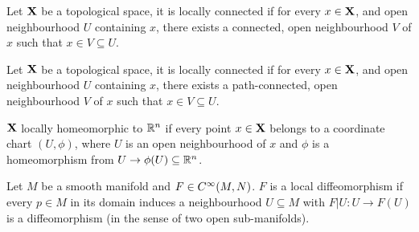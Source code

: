 \documentclass[../../main.tex]{subfiles}
\begin{document}
\begin{definition}\label{chp4:locally-connected-definition}
    Let ${\mathbf{X}}$ be a topological space, it is locally connected if for every $x\in{\mathbf{X}}$, and open neighbourhood $U$ containing $x$, there exists a connected, open neighbourhood $V$ of $x$ such that $x\in V\subseteq U$.
\end{definition}

\begin{definition}\label{chp4:locally-path-connected-definition}
    Let ${\mathbf{X}}$ be a topological space, it is locally connected if for every $x\in{\mathbf{X}}$, and open neighbourhood $U$ containing $x$, there exists a path-connected, open neighbourhood $V$ of $x$ such that $x\in V\subseteq U$.
\end{definition}

\begin{definition}\label{chp4:locally-homeomorphic-definition}
    ${\mathbf{X}}$ locally homeomorphic to ${\mathbb{R}^n}$ if every point $x\in{\mathbf{X}}$ belongs to a coordinate chart $(U,\phi)$, where $U$ is an open neighbourhood of $x$ and $\phi$ is a homeomorphism from $U\to\phi(U)\subseteq{\mathbb{R}^n}$.
\end{definition}

\begin{definition}\label{lee-chp4:local-diffeomorphism-definition}
    Let $M$ be a smooth manifold and $F\in \cinf[M,N]$. $F$ is a local diffeomorphism if every $p\in M$ in its domain induces a neighbourhood $U\subseteq M$ with $F|U:U\to F(U)$ is a diffeomorphism (in the sense of two open sub-manifolds).
\end{definition}


\newpage

\setcounter{theproblem}{0}
\newpage
\newpage
\newpage
\newpage
\newpage
\newpage
\newpage
\newpage
\newpage
\newpage
\newpage
\newpage
\newpage
\newpage
\newpage
\newpage
\newpage
\newpage
\newpage
\newpage
\newpage
\newpage
\newpage
\newpage
\newpage
\newpage
\newpage
\newpage
\newpage
\newpage
\newpage
\newpage
\newpage
\newpage
\newpage
\newpage
\newpage
\newpage
\newpage
\newpage
\newpage
\end{document}

